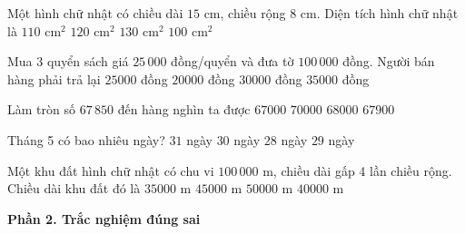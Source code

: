 \begin{ex} %
Một hình chữ nhật có chiều dài $15\text{ cm}$, chiều rộng $8\text{ cm}$. Diện tích hình chữ nhật là
\choice
{$110\text{ cm}^2$}
{\True $120\text{ cm}^2$}
{$130\text{ cm}^2$}
{$100\text{ cm}^2$}
\end{ex}

\begin{ex} %
Mua 3 quyển sách giá $25\,000$ đồng/quyển và đưa tờ $100\,000$ đồng. Người bán hàng phải trả lại
\choice
{\True $25000$ đồng}
{$20000$ đồng}
{$30000$ đồng}
{$35000$ đồng}
\end{ex}

\begin{ex} %
Làm tròn số $67\,850$ đến hàng nghìn ta được
\choice
{$67000$}
{$70000$}
{\True $68000$}
{$67900$}
\end{ex}

\begin{ex} %
Tháng 5 có bao nhiêu ngày?
\choice
{\True $31$ ngày}
{$30$ ngày}
{$28$ ngày}
{$29$ ngày}
\end{ex}

\begin{ex} %
Một khu đất hình chữ nhật có chu vi $100\,000\text{ m}$, chiều dài gấp 4 lần chiều rộng. Chiều dài khu đất đó là
\choice
{$35000\text{ m}$}
{$45000\text{ m}$}
{$50000\text{ m}$}
{\True $40000\text{ m}$}
\end{ex}

\textbf{Phần 2. Trắc nghiệm đúng sai}

